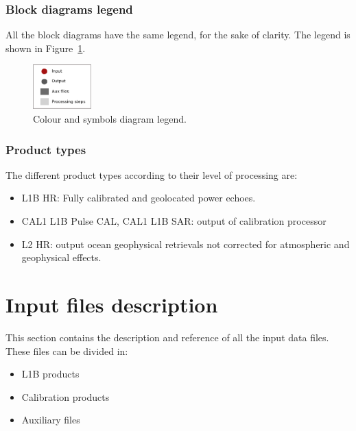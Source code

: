\documentclass[11pt,a4paper]{article}
\begin{document}
\subsubsection{Block diagrams legend}

All the block diagrams have the same legend, for the sake of clarity. The legend is shown in Figure~\ref{fig:legend_blockdiagram}.

\begin{figure}[htb!]\centering
  \centering
  \includegraphics[width=0.2\textwidth]{fig/legend_blockdiagram}
  \caption[ Colour and symbols diagram legend]{Colour and symbols diagram legend.}
  \label{fig:legend_blockdiagram}
\end{figure}


\subsubsection{Product types}

The different product types according to their level of processing are:

\begin{itemize}
 \item L1B HR: Fully calibrated and geolocated power echoes.
 \item CAL1 L1B Pulse CAL, CAL1 L1B SAR: output of calibration processor
 \item L2 HR: output ocean geophysical retrievals not corrected for atmospheric and geophysical effects.

\end{itemize}




\clearpage
\newpage
\section{Input files description}\label{sec:inputfiles_description}

This section contains the description and reference of all the input data files. These files can be divided
in:

\begin{itemize}
 \item L1B products
 \item Calibration products
 \item Auxiliary files
\end{itemize}
\end{document}
